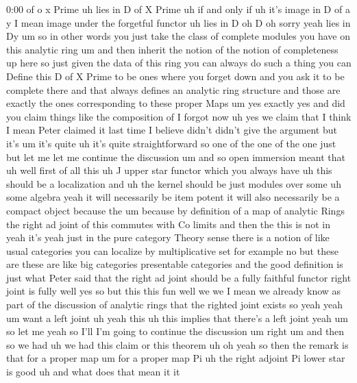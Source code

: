 \begin{unfinished}{0:00}
of  o  x
Prime  uh
lies  in  D  of  X  Prime  uh  if  and  only  if
uh  it's
image  in  D  of  a  y  I  mean  image  under  the
forgetful  functor  uh
lies  in  D  oh  D  oh  sorry  yeah  lies  in
Dy  um  so  in  other  words  you  just  take
the  class  of  complete  modules  you  have
on  this  analytic  ring  um  and  then
inherit  the  notion  of  the  notion  of
completeness  up  here  so  just  given  the
data  of  this  ring  you  can  always  do  such
a  thing  you  can  Define  this  D  of  X  Prime
to  be  ones  where  you  forget  down  and  you
ask  it  to  be  complete  there  and  that
always  defines  an  analytic  ring
structure  and  those  are  exactly  the  ones
corresponding  to  these  proper
Maps
um
yes
exactly  yes  and  did  you  claim  things
like  the  composition  of  I  forgot  now
uh  yes  we  claim  that  I  think  I  mean
Peter  claimed  it  last  time  I  believe
didn't  didn't  give  the  argument  but  it's
um  it's  quite  uh  it's  quite
straightforward  so  one  of  the  one  of  the
one  just  but  let  me  let  me  continue  the
discussion  um  and  so  open  immersion
meant  that  uh  well  first  of  all  this  uh
J  upper  star  functor  which  you  always
have
uh  this  should  be  a
localization
and  uh  the
kernel  should  be  just  modules  over  some
uh  some
algebra  yeah  it  will  necessarily  be  item
potent  it  will  also  necessarily  be  a
compact  object  because
the  um  because  by  definition  of  a  map  of
analytic  Rings  the  right  ad  joint  of
this  commutes  with  Co  limits  and  then
the  this  is  not
in  yeah  it's  yeah  just  in  the  pure
category  Theory
sense  there  is  a  notion  of  like  usual
categories  you  can  localize  by
multiplicative  set
for
example  no  but  these  are  these  are  like
big  categories  presentable  categories
and  the  good  definition  is  just  what
Peter  said  that  the  right  ad  joint
should  be  a  fully  faithful
functor  right  joint  is  fully  well  yes  so
but  this  this  fun  well  we  we  I  mean  we
already  know  as  part  of  the  discussion
of  analytic  rings  that  the  righted  joint
exists
so  yeah
yeah
um  want  a  left  joint  uh  yeah  this  uh
this  implies  that  there's  a  left  joint
yeah  um  so  let  me  yeah  so  I'll  I'm  going
to  continue  the
discussion
um  right  um  and  then  so  we  had  uh  we  had
this  claim  or  this
theorem  uh  oh  yeah  so  then  the  remark  is
that  for  a  proper  map
um  for  a  proper  map  Pi  uh  the  right
adjoint  Pi  lower  star  is
good  uh  and  what  does  that  mean  it  it

\end{unfinished}
